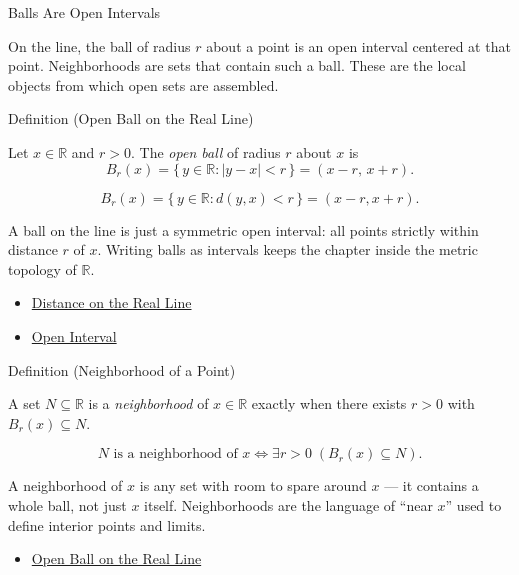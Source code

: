 \label{sec:neighborhoods-and-balls}

\begin{topicbox}{Balls Are Open Intervals}
\begin{exposition}
On the line, the ball of radius $r$ about a point is an open interval centered at that point. Neighborhoods are sets that contain such a ball. These are the local objects from which open sets are assembled.
\end{exposition}
\end{topicbox}
\begin{definitionbox}{Definition (Open Ball on the Real Line)}
\begin{definition}
\label{def:open-ball}
Let $x\in\mathbb{R}$ and $r>0$. The \emph{open ball} of radius $r$ about $x$ is
\[
B_{r}(x)=\{\,y\in\mathbb{R} : |y-x|<r\,\}=(x-r,\,x+r).
\]
\end{definition}
\end{definitionbox}
\begin{remark*}
\[
B_{r}(x)=\{\,y\in\mathbb{R} : d(y,x)<r\,\}=(x-r,x+r).
\]
\end{remark*}
\begin{remark*}[Interpretation]
A ball on the line is just a symmetric open interval: all points strictly within distance $r$ of $x$. Writing balls as intervals keeps the chapter inside the metric topology of $\mathbb{R}$.
\end{remark*}
\begin{dependencies}
\begin{itemize}
  \item \hyperref[def:distance-on-real-line]{Distance on the Real Line}
  \item \hyperref[def:open-interval]{Open Interval}
\end{itemize}
\end{dependencies}
\begin{definitionbox}{Definition (Neighborhood of a Point)}
\begin{definition}
\label{def:neighborhood-of-point}
A set $N\subseteq\mathbb{R}$ is a \emph{neighborhood} of $x\in\mathbb{R}$ exactly when there exists $r>0$ with $B_{r}(x)\subseteq N$.
\end{definition}
\end{definitionbox}
\begin{remark*}
\[
N \text{ is a neighborhood of } x \Longleftrightarrow \exists r>0\;(B_{r}(x)\subseteq N).
\]
\end{remark*}
\begin{remark*}[Interpretation]
A neighborhood of $x$ is any set with room to spare around $x$ --- it contains a whole ball, not just $x$ itself. Neighborhoods are the language of ``near $x$'' used to define interior points and limits.
\end{remark*}
\begin{dependencies}
\begin{itemize}
  \item \hyperref[def:open-ball]{Open Ball on the Real Line}
\end{itemize}
\end{dependencies}
